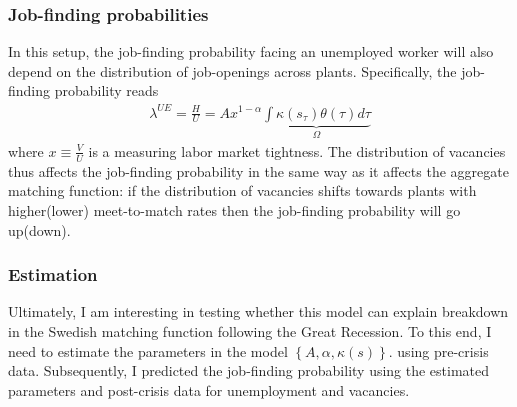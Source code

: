 \subsubsection{Job-finding probabilities}
In this setup, the job-finding probability facing an unemployed worker will also depend on the distribution of job-openings across plants. Specifically, the job-finding probability reads
\begin{align}
\lambda^{UE}=\frac{H}{U}=Ax^{1-\alpha}\underbrace{\int \kappa(s_\tau) \theta (\tau) d \tau}_{\Omega} \label{eq:jfr_m}
\end{align} 
where $x \equiv \frac{V}{U}$ is a measuring labor market tightness. The distribution of vacancies thus affects the job-finding probability in the same way as it affects the aggregate matching function: if the distribution of vacancies shifts towards plants with higher(lower) meet-to-match rates then the job-finding probability will go up(down).


\subsubsection{Estimation}

Ultimately, I am interesting in testing whether this model can explain breakdown in the Swedish matching function following the Great Recession. To this end, I need to estimate the parameters in the model $\left\{ A, \alpha, \kappa(s) \right\}$.  using pre-crisis data. Subsequently, I predicted the job-finding probability using the estimated parameters and post-crisis data for unemployment and vacancies. 

